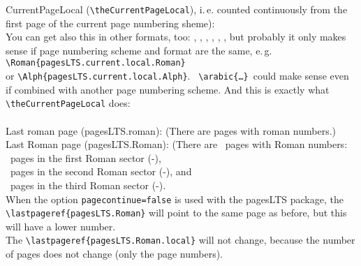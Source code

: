 \documentclass[british]{article}
\begin{document}
\noindent CurrentPageLocal (\texttt{\textbackslash theCurrentPageLocal}),
i.\,e. counted continuously from the first page of the
current page numbering sheme): \theCurrentPageLocal \\
You can get also this in other formats, too:
, ,
, ,
, ,
but probably it only makes sense if page numbering scheme and format are
the same, e.\,g.\\
\texttt{\textbackslash Roman\{pagesLTS.current.local.Roman\}}\\
or \texttt{\textbackslash Alph\{pagesLTS.current.local.Alph\}}.\ %
\texttt{\textbackslash arabic\{\ldots \}}\ could make sense
even if combined with another page numbering scheme.
And this is exactly what \texttt{\textbackslash theCurrentPageLocal} does:\\
\\

\noindent Last roman page (pagesLTS.roman): 
(There are  pages with roman numbers.)\\

\noindent Last Roman page (pagesLTS.Roman): 
(There are ~pages with Roman numbers:\\
~pages in the first Roman sector
(\pageref{Roman}{\hskip3em }-),\\
~pages in the second Roman sector
(\pageref{Roman2}{\hskip3em }-), and\\
~pages in the third Roman sector
(\pageref{Roman3}{\hskip3em }-).\\

When the option \texttt{pagecontinue=false} is used with the
\textsf{pagesLTS} package, the
\texttt{\textbackslash lastpageref\{pagesLTS.Roman\}} will point
to the same page as before, but this will have a lower number.\\
The \texttt{\textbackslash lastpageref\{pagesLTS.Roman.local\}}
will not change, because the number of pages does not change
(only the page numbers).\\
\end{document}

